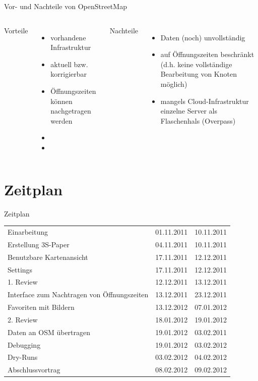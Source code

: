 \documentclass[hyperref]{beamer}
\begin{document}
\begin{frame}{Vor- und Nachteile von OpenStreetMap}
	\begin{columns}
		\column{5.1cm}
		Vorteile
		\begin{itemize}
			\item vorhandene Infrastruktur
			\item aktuell bzw. korrigierbar
			\item Öffnungszeiten können nachgetragen werden 	
			\item[] \phantom{X}
			\item[] \phantom{X}
		\end{itemize}		
		\column{6cm}
		Nachteile
		\begin{itemize}
			\item Daten (noch) unvollständig
			\item auf Öffnungszeiten beschränkt (d.h. keine vollständige Bearbeitung von Knoten möglich)
                        \item mangels Cloud-Infrastruktur einzelne Server als Flaschenhals (Overpass)
		\end{itemize}
	\end{columns}
\end{frame}

\section{Zeitplan}



\begin{frame}{Zeitplan}

		\begin{tabular}{l l l}
			Einarbeitung & 01.11.2011 & 10.11.2011\\
			Erstellung 3S-Paper & 04.11.2011 & 10.11.2011\\
			Benutzbare Kartenansicht & 17.11.2011 & 12.12.2011\\
			Settings & 17.11.2011 & 12.12.2011 \\
			1. Review & 12.12.2011 & 13.12.2011\\
			Interface zum Nachtragen von Öffnungszeiten & 13.12.2011 & 23.12.2011\\
			Favoriten mit Bildern & 13.12.2012 & 07.01.2012\\
			2. Review & 18.01.2012 & 19.01.2012\\
			Daten an OSM übertragen & 19.01.2012 & 03.02.2011\\
			Debugging & 19.01.2012 & 03.02.2012\\
			Dry-Runs & 03.02.2012 & 04.02.2012\\
			Abschlussvortrag & 08.02.2012 & 09.02.2012\\
		\end{tabular}

\end{frame}
\end{document}
